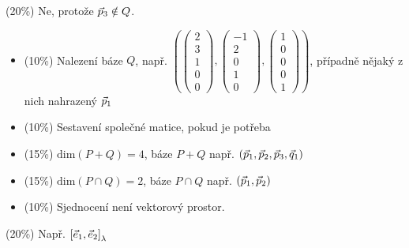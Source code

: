 \documentclass{article}
\newcommand{\mathdim}{\ensuremath{\mathrm{dim}}}
\newcommand{\mathvec}{\ensuremath{\vec}}
\begin{document}
\begin{Answer}[ref=subspaces]
	\Question (20\%) \quad Ne, protože \( \mathvec{p}_3 \notin Q \).
	\Question \begin{itemize}
		\item (10\%) \quad Nalezení báze \( Q \), např. \( \left( \begin{pmatrix} 2 \\ 3 \\ 1 \\ 0 \\ 0 \end{pmatrix}, \begin{pmatrix} -1 \\ 2 \\ 0 \\ 1 \\ 0 \end{pmatrix}, \begin{pmatrix} 1 \\ 0 \\ 0 \\ 0 \\ 1 \end{pmatrix} \right) \), případně nějaký z nich nahrazený \( \mathvec{p}_1 \)
		\item (10\%) \quad Sestavení společné matice, pokud je potřeba
		\item (15\%) \quad \( \mathdim{(P + Q)} = 4 \), báze \( P + Q \) např. \( \left( \mathvec{p}_1, \mathvec{p}_2, \mathvec{p}_3, \mathvec{q}_1 \right) \)
		\item (15\%) \quad \( \mathdim{(P \cap Q)} = 2 \), báze \( P \cap Q \) např. \( \left( \mathvec{p}_1, \mathvec{p}_2 \right) \)
		\item (10\%) \quad Sjednocení není vektorový prostor.
	\end{itemize}
	\Question (20\%) \quad Např. \( \left[ \mathvec{e}_1, \mathvec{e}_2 \right]_\lambda \)
\end{Answer}

\newpage
\end{document}
